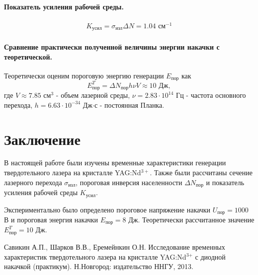 \documentclass[a4paper,14pt]{extarticle}
\begin{document}
\paragraph{Показатель усиления рабочей среды. }%
\begin{gather}
    K_{\text{усил}} = \sigma_{\text{изл}} \Delta N = 1.04 \text{ см}^{-1}
\end{gather}


\paragraph{Сравнение практически полученной величины энергии накачки с
теоретической.}
Теоретически оценим пороговую энергию генерации $E_{\text{пор}}$ как 
\begin{equation}
  E^{T}_{\text{пор}} = \Delta N_{\text{пор}} h \nu V \approx 10 \text{ Дж}, 
  \label{eq:}
\end{equation}
где $V \approx 7.85$ см$^3$ - объем лазерной среды, $\nu=2.83\cdot 10^{14}$ Гц - частота основного перехода,
$h=6.63\cdot 10^{-34}$ Дж$\cdot$с - постоянная Планка.


\section*{Заключение}
В настоящей работе были изучены временные характеристики генерации твердотельного лазера на кристалле YAG:Nd$^{3+}$. 
Также были рассчитаны сечение лазерного перехода $\sigma_{\text{изл}}$, пороговая инверсия населенности
$\Delta N_{\text{пор}}$ и показатель усиления рабочей среды $K_{\text{усил}}$. 

Экспериментально было определено пороговое напряжение накачки $U_{пор} = 1000$ В и пороговая энергия накачки
$E_{\text{пор}} = 8$ Дж. Теоретически рассчитанное значение $E^{T}_{\text{пор}} = 10$ Дж. 
\begin{thebibliography}{}

   Савикин А.П., Шарков В.В., Еремейнкин О.Н. Исследование временных характеристик твердотельного лазера на кристалле  YAG:Nd${}^{{3\texttt{+}}}$ с диодной накачкой (практикум). Н.Новгород: издательство ННГУ, 2013.

\end{thebibliography}
\end{document}

